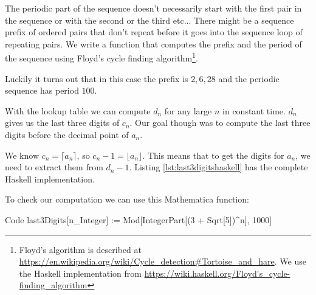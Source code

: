The periodic part of the sequence doesn't necessarily start with the first pair in the sequence or with the second or the third etc... There might be a sequence prefix of ordered pairs that don't repeat before it goes into the sequence loop of repeating pairs. 
{}
We write a function that computes the prefix and the period of the sequence using Floyd's cycle finding algorithm\footnote{Floyd's algorithm is described at \url{https://en.wikipedia.org/wiki/Cycle_detection\#Tortoise_and_hare}. We use the Haskell implementation from \url{https://wiki.haskell.org/Floyd's_cycle-finding_algorithm}}. 

Luckily it turns out that in this case the prefix is  $2, 6, 28$  and the periodic sequence has period $100$.

With the lookup table we can compute $d_n$ for any large $n$ in constant time. $d_n$ gives us the last three digits of $c_n$. Our goal though was to compute the last three digits before the decimal point of $a_n$.  

We know $c_n=\lceil a_n \rceil$, so $c_n - 1=\lfloor a_n \rfloor$. This means that to get the digits for $a_n$, we need to extract them from $d_n - 1$. Listing \ref{lst:last3digitshaskell} has the complete Haskell implementation.

\begin{fullwidth}



To check our computation we can use this Mathematica function:

\begin{mmaCell}[morepattern={n, n_Integer}]{Code}
  last3Digits[n_Integer] := Mod[IntegerPart[(3 + Sqrt[5])^n], 1000]
\end{mmaCell}

\end{fullwidth}
